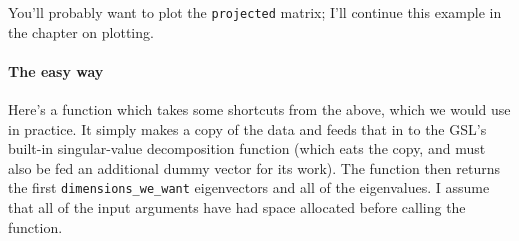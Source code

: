 You'll probably want to plot the {\tt projected} matrix; I'll continue this example in the chapter on
plotting.

\paragraph{The easy way}

Here's a function which takes some shortcuts from the above, which we would use in practice. It simply
makes a copy of the data and feeds that in to the GSL's built-in singular-value decomposition function
(which eats the copy, and must also be fed an additional dummy vector for its work). The function then
returns the first {\tt dimensions\_we\_want} eigenvectors and all of the eigenvalues. I assume that all of
the input arguments have had space allocated before calling the function.
